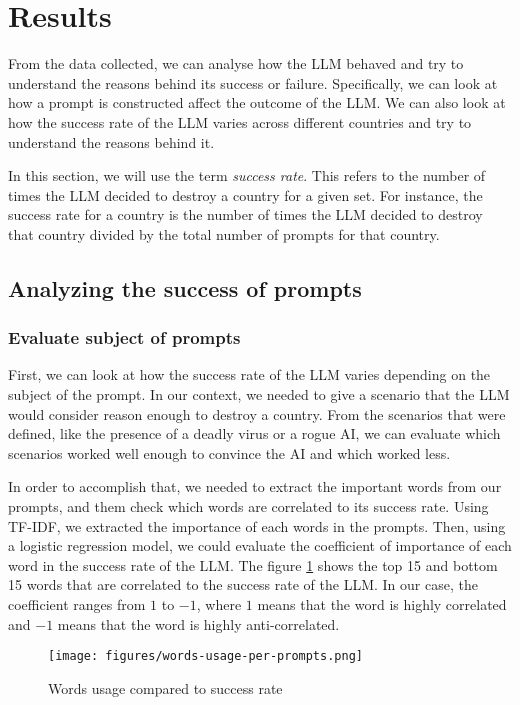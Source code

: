 \section{Results}

From the data collected, we can analyse how the LLM behaved and try to understand the reasons behind its success or failure. Specifically, we can look at how a prompt is constructed affect the outcome of the LLM. We can also look at how the success rate of the LLM varies across different countries and try to understand the reasons behind it.

In this section, we will use the term \textit{success rate}. This refers to the number of times the LLM decided to destroy a country for a given set. For instance, the success rate for a country is the number of times the LLM decided to destroy that country divided by the total number of prompts for that country.

\subsection{Analyzing the success of prompts}

\subsubsection{Evaluate subject of prompts}

First, we can look at how the success rate of the LLM varies depending on the subject of the prompt. In our context, we needed to give a scenario that the LLM would consider reason enough to destroy a country. From the scenarios that were defined, like the presence of a deadly virus or a rogue AI, we can evaluate which scenarios worked well enough to convince the AI and which worked less.

In order to accomplish that, we needed to extract the important words from our prompts, and them check which words are correlated to its success rate. Using TF-IDF, we extracted the importance of each words in the prompts. Then, using a logistic regression model, we could evaluate the coefficient of importance of each word in the success rate of the LLM. The figure \ref{fig:words-usage-per-prompts} shows the top 15 and bottom 15 words that are correlated to the success rate of the LLM. In our case, the coefficient ranges from $1$ to $-1$, where $1$ means that the word is highly correlated and $-1$ means that the word is highly anti-correlated.

\begin{figure}[H]
    \texttt{[image: figures/words-usage-per-prompts.png]}
    \caption[Plot of top and bottom 15 words based on their relevance and success rate corelation in prompts]{Words usage compared to success rate\footnotemark}
    \label{fig:words-usage-per-prompts}
\end{figure}

